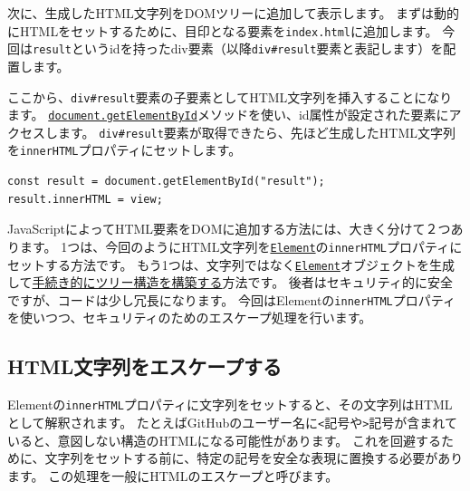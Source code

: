 次に、生成したHTML文字列をDOMツリーに追加して表示します。
まずは動的にHTMLをセットするために、目印となる要素を\texttt{index.html}に追加します。
今回は\texttt{result}というidを持ったdiv要素（以降\texttt{div\#result}要素と表記します）を配置します。



ここから、\texttt{div\#result}要素の子要素としてHTML文字列を挿入することになります。
\href{https://developer.mozilla.org/ja/docs/Web/API/Document/getElementById}\texttt{document.getElementById}メソッドを使い、id属性が設定された要素にアクセスします。
\texttt{div\#result}要素が取得できたら、先ほど生成したHTML文字列を\texttt{innerHTML}プロパティにセットします。

\begin{lstlisting}
const result = document.getElementById("result");
result.innerHTML = view;
\end{lstlisting}

JavaScriptによってHTML要素をDOMに追加する方法には、大きく分けて２つあります。
1つは、今回のようにHTML文字列を\href{https://developer.mozilla.org/ja/docs/Web/API/Element/innerHTML}\texttt{Element}の\texttt{innerHTML}プロパティにセットする方法です。
もう1つは、文字列ではなく\href{https://developer.mozilla.org/ja/docs/Web/API/Element}\texttt{Element}オブジェクトを生成して\href{https://developer.mozilla.org/ja/docs/Web/API/Node/appendChild}{手続き的にツリー構造を構築する}方法です。
後者はセキュリティ的に安全ですが、コードは少し冗長になります。
今回はElementの\texttt{innerHTML}プロパティを使いつつ、セキュリティのためのエスケープ処理を行います。

\hypertarget{escape-html}{%
\subsection{HTML文字列をエスケープする}\label{escape-html}}

Elementの\texttt{innerHTML}プロパティに文字列をセットすると、その文字列はHTMLとして解釈されます。
たとえばGitHubのユーザー名に\texttt{<}記号や\texttt{>}記号が含まれていると、意図しない構造のHTMLになる可能性があります。
これを回避するために、文字列をセットする前に、特定の記号を安全な表現に置換する必要があります。
この処理を一般にHTMLのエスケープと呼びます。

